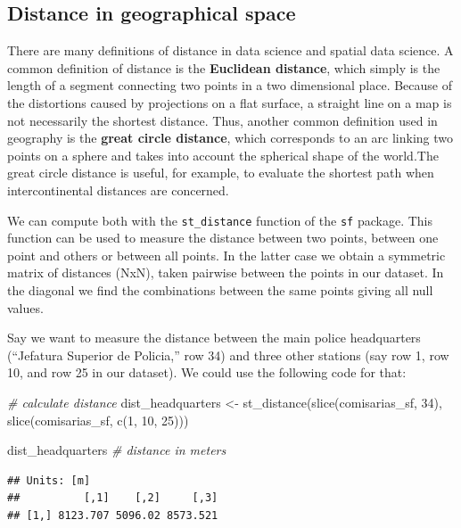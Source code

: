 \documentclass[
]{book}
\makeatletter
\newenvironment{Shaded}{\begin{snugshade}}{\end{snugshade}}
\newcommand{\CommentTok}[1]{\textcolor[rgb]{0.37,0.37,0.37}{\textit{#1}}}
\newcommand{\DecValTok}[1]{\textcolor[rgb]{0.06,0.06,0.06}{#1}}
\newcommand{\FunctionTok}[1]{\textcolor[rgb]{0,0,0}{#1}}
\newcommand{\NormalTok}[1]{#1}
\newcommand{\OtherTok}[1]{\textcolor[rgb]{0.37,0.37,0.37}{#1}}
\newenvironment{kframe}{%
\medskip{}
\setlength{\fboxsep}{.8em}
 \def\at@end@of@kframe{}%
 \ifinner\ifhmode%
  \def\at@end@of@kframe{\end{minipage}}%
  \begin{minipage}{\columnwidth}%
 \fi\fi%
 \def\FrameCommand##1{\hskip\@totalleftmargin \hskip-\fboxsep
 \colorbox{shadecolor}{##1}\hskip-\fboxsep
     \hskip-\linewidth \hskip-\@totalleftmargin \hskip\columnwidth}%
 \MakeFramed {\advance\hsize-\width
   \@totalleftmargin\z@ \linewidth\hsize
   \@setminipage}}%
 {\par\unskip\endMakeFramed%
 \at@end@of@kframe}
\renewenvironment{Shaded}{\begin{kframe}}{\end{kframe}}
\makeatother
\begin{document}
\hypertarget{distance-in-geographical-space}{%
\subsection{Distance in geographical space}\label{distance-in-geographical-space}}

There are many definitions of distance in data science and spatial data science. A common definition of distance is the \textbf{Euclidean distance}, which simply is the length of a segment connecting two points in a two dimensional place. Because of the distortions caused by projections on a flat surface, a straight line on a map is not necessarily the shortest distance. Thus, another common definition used in geography is the \textbf{great circle distance}, which corresponds to an arc linking two points on a sphere and takes into account the spherical shape of the world.The great circle distance is useful, for example, to evaluate the shortest path when intercontinental distances are concerned.

We can compute both with the \texttt{st\_distance} function of the \texttt{sf} package. This function can be used to measure the distance between two points, between one point and others or between all points. In the latter case we obtain a symmetric matrix of distances (NxN), taken pairwise between the points in our dataset. In the diagonal we find the combinations between the same points giving all null values.

Say we want to measure the distance between the main police headquarters (``Jefatura Superior de Policia,'' row 34) and three other stations (say row 1, row 10, and row 25 in our dataset). We could use the following code for that:

\begin{Shaded}
\begin{Highlighting}[]
\CommentTok{\# calculate distance}
\NormalTok{dist\_headquarters }\OtherTok{\textless{}{-}} \FunctionTok{st\_distance}\NormalTok{(}\FunctionTok{slice}\NormalTok{(comisarias\_sf, }\DecValTok{34}\NormalTok{), }
                              \FunctionTok{slice}\NormalTok{(comisarias\_sf, }\FunctionTok{c}\NormalTok{(}\DecValTok{1}\NormalTok{, }\DecValTok{10}\NormalTok{, }\DecValTok{25}\NormalTok{)))}

\NormalTok{dist\_headquarters }\CommentTok{\# distance in meters}
\end{Highlighting}
\end{Shaded}

\begin{verbatim}
## Units: [m]
##          [,1]    [,2]     [,3]
## [1,] 8123.707 5096.02 8573.521
\end{verbatim}
\end{document}
